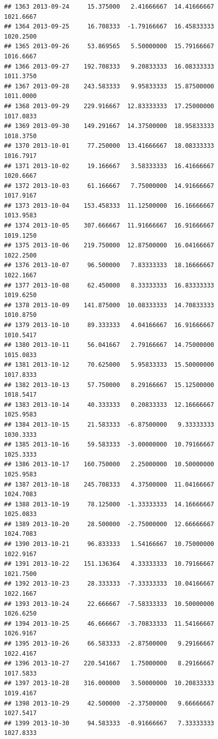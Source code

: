 \documentclass[
]{article}
\begin{document}
\begin{verbatim}
## 1363 2013-09-24     15.375000   2.41666667  14.41666667    1021.6667
## 1364 2013-09-25     16.708333  -1.79166667  16.45833333    1020.2500
## 1365 2013-09-26     53.869565   5.50000000  15.79166667    1016.6667
## 1366 2013-09-27    192.708333   9.20833333  16.08333333    1011.3750
## 1367 2013-09-28    243.583333   9.95833333  15.87500000    1011.0000
## 1368 2013-09-29    229.916667  12.83333333  17.25000000    1017.0833
## 1369 2013-09-30    149.291667  14.37500000  18.95833333    1018.3750
## 1370 2013-10-01     77.250000  13.41666667  18.08333333    1016.7917
## 1371 2013-10-02     19.166667   3.58333333  16.41666667    1020.6667
## 1372 2013-10-03     61.166667   7.75000000  14.91666667    1017.9167
## 1373 2013-10-04    153.458333  11.12500000  16.16666667    1013.9583
## 1374 2013-10-05    307.666667  11.91666667  16.91666667    1019.1250
## 1375 2013-10-06    219.750000  12.87500000  16.04166667    1022.2500
## 1376 2013-10-07     96.500000   7.83333333  18.16666667    1022.1667
## 1377 2013-10-08     62.450000   8.33333333  16.83333333    1019.6250
## 1378 2013-10-09    141.875000  10.08333333  14.70833333    1010.8750
## 1379 2013-10-10     89.333333   4.04166667  16.91666667    1010.5417
## 1380 2013-10-11     56.041667   2.79166667  14.75000000    1015.0833
## 1381 2013-10-12     70.625000   5.95833333  15.50000000    1017.8333
## 1382 2013-10-13     57.750000   8.29166667  15.12500000    1018.5417
## 1383 2013-10-14     40.333333   0.20833333  12.16666667    1025.9583
## 1384 2013-10-15     21.583333  -6.87500000   9.33333333    1030.3333
## 1385 2013-10-16     59.583333  -3.00000000  10.79166667    1025.3333
## 1386 2013-10-17    160.750000   2.25000000  10.50000000    1025.9583
## 1387 2013-10-18    245.708333   4.37500000  11.04166667    1024.7083
## 1388 2013-10-19     78.125000  -1.33333333  14.16666667    1025.0833
## 1389 2013-10-20     28.500000  -2.75000000  12.66666667    1024.7083
## 1390 2013-10-21     96.833333   1.54166667  10.75000000    1022.9167
## 1391 2013-10-22    151.136364   4.33333333  10.79166667    1021.7500
## 1392 2013-10-23     28.333333  -7.33333333  10.04166667    1022.1667
## 1393 2013-10-24     22.666667  -7.58333333  10.50000000    1026.6250
## 1394 2013-10-25     46.666667  -3.70833333  11.54166667    1026.9167
## 1395 2013-10-26     66.583333  -2.87500000   9.29166667    1022.4167
## 1396 2013-10-27    220.541667   1.75000000   8.29166667    1017.5833
## 1397 2013-10-28    316.000000   3.50000000  10.20833333    1019.4167
## 1398 2013-10-29     42.500000  -2.37500000   9.66666667    1027.5417
## 1399 2013-10-30     94.583333  -0.91666667   7.33333333    1027.8333

\end{verbatim}
\end{document}
